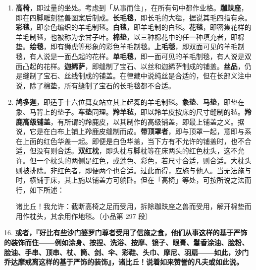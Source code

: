 \begin{enumerate}\item \textbf{高椅}，即过量的坐处。考虑到「从事而住」，在所有句中都作业格。\textbf{跏趺座}，即在四脚雕刻猛兽图案后制成。\textbf{长毛毯}，即长毛的大毯，据说其毛四指有余。\textbf{彩毯}，即杂色编织的羊毛制毯。\textbf{白毯}，即羊毛制的白毯。\textbf{花毯}，即密集花样的羊毛制毯，也被称为余甘子叶。\textbf{棉垫}，以三种棉花中的任一种填充者，即棉垫。\textbf{绘毯}，即有狮虎等形象的彩色羊毛制毯。\textbf{上毛毯}，即双面可见的羊毛制毯，有人说是一面凸起的花样。\textbf{单毛毯}，即一面可见的羊毛制毯，有人说是双面凸起的花样。\textbf{迦絺萨}，即缝制了宝石、以丝和迦絺萨制成的铺盖。\textbf{丝品}，仍是缝制了宝石、丝线制成的铺盖。在律藏中说纯丝是合适的，但在长部义注中说，除了棉垫，所有缝制了宝石的长毛毯都不合适。
\item \textbf{鸠多迦}，即适于十六位舞女站立其上起舞的羊毛制毯。\textbf{象垫}、\textbf{马垫}，即垫在象、马背上的垫子。\textbf{车垫}同理。\textbf{羚羊毡}，即以羚羊皮按床的尺寸缝制的毡。\textbf{羚鹿高级铺盖}，有所谓的羚鹿皮，以其制作的高级铺盖，即最上铺盖之义。据说，它是在白布上铺上羚鹿皮缝制而成。\textbf{带顶罩者}，即与顶罩一起，意即与系在上面的红色华盖一起。即便是白色华盖，当下方有不允许的铺盖时，也不合适，但没有则合适。\textbf{双红枕}，即头枕与脚枕等在床两头的红色枕头，这不允许。但一个枕头的两侧是红色，或莲色、彩色，若尺寸合适，则合适。大枕头则被排除。非红色者，即便两个也合适。过此而得，应施与他人。当无法施与时，横铺于床，其上施以铺盖方可躺卧。但在「高椅」等处，可按所说之法而行，如下所述：\begin{quoting}诸比丘！我允许：截断高椅之足而受用，拆除跏趺座之兽而受用，解开棉垫而用作枕头，其余用作地毯。{\bluefootnotesize 〔小品第 297 段〕}\end{quoting}\end{enumerate}

{\Large 16.} \textbf{或者，『好比有些沙门婆罗门尊者受用了信施之食，他们从事这样的基于严饰的装饰而住——例如涂身、按捏、洗浴、按摩、镜子、眼膏、鬘香涂油、脸粉、脸油、手串、顶串、杖、筒、剑、伞、彩鞋、头巾、摩尼、羽扇——如此，沙门乔达摩戒离这样的基于严饰的装饰』，诸比丘！说着如来赞誉的凡夫或如此说。}

